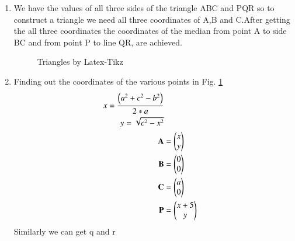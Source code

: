 \begin{enumerate}[label=\thesection.\arabic*.,ref=\thesection.\theenumi]
\item We have the values of all three sides of the triangle ABC and PQR so to construct  a triangle we need all three coordinates of A,B and C.After getting the all three coordinates the coordinates of the median from point A to side BC and from point P to line QR, are achieved.


\begin{figure}[!ht]
\centering
\resizebox{\columnwidth}{!}{}
\caption{ Triangles by Latex-Tikz}
\label{fig:con_triangles}	
\end{figure}
%
%
%


%
\begin{table}[ht!]
\centering

\caption{To construct $\triangle ACB$ and $\triangle PQR$}
\label{table:table1}	
\end{table}

%
\item Finding out  the coordinates of the various points in Fig. \ref{fig:con_triangles}
\label{const:con_triangles}
\\
% 
\begin{align}
\label{eq:constr_a}
x = \frac{\left(a^2 + c^2 - b^2\right)}{2*a}
\\
y = \sqrt{c^2 - x^2}
\\
\mathbf{A} &= \begin{pmatrix}x \\ y\end{pmatrix}
\\
\mathbf{B} &= \begin{pmatrix}0 \\ 0\end{pmatrix}
\\
\label{eq:constr_c}
\mathbf{C} &= \begin{pmatrix}a  \\ 0 \end{pmatrix}
\\
\mathbf{P} &= \begin{pmatrix}x+5 \\ y \end{pmatrix}
\label{eq:constr_b}
\end{align}
Similarly we can get q and r
\\


\end{enumerate}
